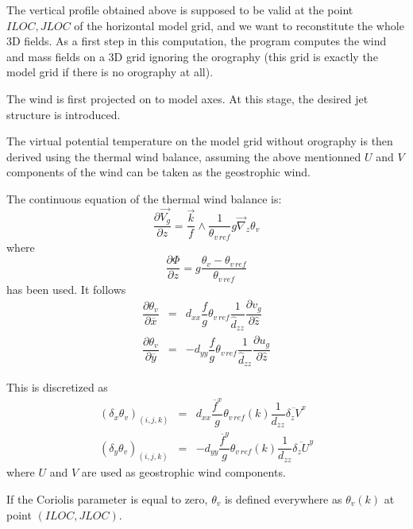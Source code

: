 The vertical profile obtained above is supposed to be valid at the point
$ILOC,JLOC$ of the horizontal model grid, and we want to reconstitute the
whole 3D fields.  As a first step in this computation, the program computes
the wind and mass fields on a 3D grid ignoring the orography (this grid is
exactly the model grid if there is no orography at all).

The wind is first projected on to model axes. At this stage,
the desired jet structure is introduced.

The virtual potential temperature on the model grid without
orography is then derived using the thermal wind balance, assuming the above
mentionned
$U$ and $V$ components of the wind can be taken as the geostrophic wind.

The continuous equation of the thermal wind balance is:
\begin{equation}
\dfrac{\partial \vec{V_{g}}}{\partial z} =
\dfrac{\vec{k}}{f} \wedge \dfrac{1}{\theta_{v\,ref}} g \vec{\nabla}_{z}
\theta_{v}
\end{equation}
where
\begin{equation}
\dfrac{\partial \Phi}{\partial z} = g \dfrac{ \theta_v - \theta_{v\,ref} }
{\theta_{v\,ref} }
\end{equation}
has been used. It follows
\begin{eqnarray}
\dfrac{\partial \theta_{v} }{\partial \overline{x}} & = &
d_{xx} \dfrac{f}{g}  \theta_{v\,ref}
\dfrac{1}{\widehat{d}_{zz}} \dfrac{\partial v_{g} }{\partial \widehat{z}}
\\
\dfrac{\partial \theta_{v} }{\partial \overline{y}} &  = & - d_{yy}
\dfrac{f}{g} \theta_{v\,ref}
\dfrac{1}{\widehat{d}_{zz}} \dfrac{\partial u_{g} }{\partial \widehat{z}}
\end{eqnarray}

This is discretized as
\begin{eqnarray}
\left( \delta _{x} \theta_{v}\right)_{(i,j,k)} & = & d_{xx}
 \dfrac{\overline{f}^x}{g}
\theta_{v\,ref}(k) \dfrac{1}{d_{zz}} \overline{\delta_{z} V}^x  \\
\left( \delta _{y} \theta_{v}\right)_{(i,j,k)} & = & - d_{yy}
 \dfrac{\overline{f}^y}{g}
\theta_{v\,ref}(k) \dfrac{1}{d_{zz}} \overline{\delta_{z} U }^y
\end{eqnarray}
where $U$ and $V$ are used as geostrophic wind components.

If the Coriolis parameter is equal to zero, $\theta_{v}$ is defined everywhere
as $\theta_{v}(k)$ at point $(ILOC,JLOC)$.

